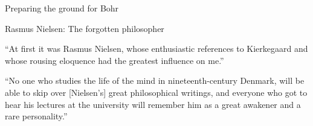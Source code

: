 \documentclass[fleqn]{beamer}
\begin{document}
\begin{frame}{Preparing the ground for Bohr}

  

\end{frame}


\begin{frame}{Rasmus Nielsen: The forgotten philosopher}

  ``At first it was Rasmus Nielsen, whose enthusiastic references to
  Kierkegaard and whose rousing eloquence had the greatest influence
  on me.'' \citep{hoffding1909}

  \vfill

  ``No one who studies the life of the mind in nineteenth-century
  Denmark, will be able to skip over [Nielsen's] great philosophical
  writings, and everyone who got to hear his lectures at the
  university will remember him as a great awakener and a rare
  personality.'' \citep{brandes1889}



\end{frame}
\end{document}
